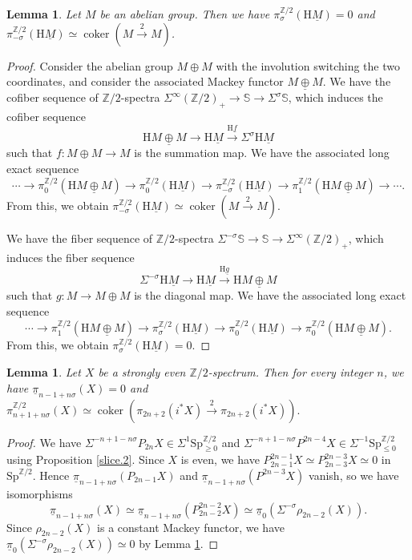 \documentclass[10pt]{amsart}
\newtheorem{lem}[thm]{Lemma}
\theoremstyle{definition}
\numberwithin{equation}{section}
\newcommand{\Sphere}{\mathbb{S}}
\newcommand{\Z}{\mathbb{Z}}
\newcommand{\rH}{\mathrm{H}}
\newcommand{\ul}{\underline}
\DeclareMathOperator{\coker}{coker}
\newcommand{\Sp}{\mathrm{Sp}}
\begin{document}
{\begin{lem}
\label{THR.2}
Let $M$ be an abelian group.
Then we have $\pi_\sigma^{\Z/2}(\rH \ul{M})= 0$ and $\pi_{-\sigma}^{\Z/2}(\rH \ul{M})\simeq \coker(M\xrightarrow{2} M)$.
\end{lem}
\begin{proof}
Consider the abelian group $M\oplus M$ with the involution switching the two coordinates,
and consider the associated Mackey functor $\ul{M\oplus M}$.
We have the cofiber sequence of $\Z/2$-spectra $\Sigma^\infty (\Z/2)_+\to \Sphere \to \Sigma^\sigma \Sphere$,
which induces the cofiber sequence
\[
\rH \ul{M\oplus M}\to \rH \ul{M}\xrightarrow{\rH \ul{f}} \Sigma^\sigma \rH{\ul{M}}
\]
such that $f\colon M\oplus M\to M$ is the summation map.
We have the associated long exact sequence
\[
\cdots \to \pi_0^{\Z/2}(\rH \ul{M\oplus M})
\to
\pi_0^{\Z/2}(\rH \ul{M})
\to
\pi_{-\sigma}^{\Z/2} (\rH \ul{M})
\to
\pi_1^{\Z/2}(\rH \ul{M\oplus M})
\to
\cdots.
\]
From this, we obtain $\pi_{-\sigma}^{\Z/2} (\rH \ul{M}) \simeq \coker(M\xrightarrow{2} M)$.


We have the fiber sequence of $\Z/2$-spectra $\Sigma^{-\sigma}\Sphere \to \Sphere \to \Sigma^\infty (\Z/2)_+$,
which induces the fiber sequence
\[
\Sigma^{-\sigma} \rH \ul{M}
\to
\rH \ul{M}
\xrightarrow{\rH \ul{g}}
\rH \ul{M\oplus M}
\]
such that $g\colon M\to M\oplus M$ is the diagonal map.
We have the associated long exact sequence
\[
\cdots
\to
\pi_1^{\Z/2}(\rH \ul{M\oplus M})
\to
\pi_\sigma^{\Z/2} (\rH \ul{M})
\to
\pi_0^{\Z/2}(\rH \ul{M})
\to
\pi_0^{\Z/2}(\rH \ul{M\oplus M}).
\]
From this,
we obtain $\pi_\sigma^{ \Z/2}(\rH \ul{M})=0$.
\end{proof}


\begin{lem}
\label{THR.3}
Let $X$ be a strongly even $\Z/2$-spectrum.
Then for every integer $n$,
we have $\ul{\pi}_{n-1+n\sigma}(X)=0$ and
\(
\pi_{n+1+n\sigma}^{\Z/2}(X)\simeq \coker(\pi_{2n+2}(i^*X)\xrightarrow{2} \pi_{2n+2}(i^*X)).
\)
\end{lem}
\begin{proof}
We have $\Sigma^{-n+1-n\sigma}P_{2n}X\in \Sigma^1 \Sp_{\geq 0}^{\Z/2}$ and $\Sigma^{-n+1-n\sigma}P^{2n-4}X\in \Sigma^{-1}\Sp_{\leq 0}^{\Z/2}$ using Proposition \ref{slice.2}.
Since $X$ is even,
we have $P_{2n-1}^{2n-1}X\simeq P_{2n-3}^{2n-3}X\simeq 0$ in $\Sp^{\Z/2}$.
Hence $\ul{\pi}_{n-1+n\sigma}(P_{2n-1}X)$ and $\ul{\pi}_{n-1+n\sigma}(P^{2n-3}X)$ vanish,
so we have isomorphisms
\[
\ul{\pi}_{n-1+n\sigma}(X)
\simeq
\ul{\pi}_{n-1+n\sigma}(P_{2n-2}^{2n-2}X)
\simeq
\ul{\pi}_{0}(\Sigma^{-\sigma}\rho_{2n-2}(X)).
\]
Since $\rho_{2n-2}(X)$ is a constant Mackey functor,
we have $\ul{\pi}_{0}(\Sigma^{-\sigma}\rho_{2n-2}(X))\simeq 0$ by Lemma \ref{THR.2}.


\end{proof}}
\end{document}
